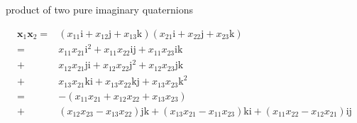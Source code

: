 \documentclass[
]{book}
\theoremstyle{definition}
\theoremstyle{definition}
\theoremstyle{definition}
\theoremstyle{definition}
\theoremstyle{remark}
\begin{document}
product of two pure imaginary quaternions

\[
\begin{aligned}
\boldsymbol{x}_{{\scriptscriptstyle 1}}\boldsymbol{x}_{{\scriptscriptstyle 2}}= & \left(x_{{\scriptscriptstyle 1}{\scriptscriptstyle 1}}\mathrm{i}+x_{{\scriptscriptstyle 1}{\scriptscriptstyle 2}}\mathrm{j}+x_{{\scriptscriptstyle 1}{\scriptscriptstyle 3}}\mathrm{k}\right)\left(x_{{\scriptscriptstyle 2}{\scriptscriptstyle 1}}\mathrm{i}+x_{{\scriptscriptstyle 2}{\scriptscriptstyle 2}}\mathrm{j}+x_{{\scriptscriptstyle 2}{\scriptscriptstyle 3}}\mathrm{k}\right)\\
= & x_{{\scriptscriptstyle 1}{\scriptscriptstyle 1}}x_{{\scriptscriptstyle 2}{\scriptscriptstyle 1}}\mathrm{i}^{{\scriptscriptstyle 2}}+x_{{\scriptscriptstyle 1}{\scriptscriptstyle 1}}x_{{\scriptscriptstyle 2}{\scriptscriptstyle 2}}\mathrm{i}\mathrm{j}+x_{{\scriptscriptstyle 1}{\scriptscriptstyle 1}}x_{{\scriptscriptstyle 2}{\scriptscriptstyle 3}}\mathrm{i}\mathrm{k}\\
+ & x_{{\scriptscriptstyle 1}{\scriptscriptstyle 2}}x_{{\scriptscriptstyle 2}{\scriptscriptstyle 1}}\mathrm{j}\mathrm{i}+x_{{\scriptscriptstyle 1}{\scriptscriptstyle 2}}x_{{\scriptscriptstyle 2}{\scriptscriptstyle 2}}\mathrm{j}^{{\scriptscriptstyle 2}}+x_{{\scriptscriptstyle 1}{\scriptscriptstyle 2}}x_{{\scriptscriptstyle 2}{\scriptscriptstyle 3}}\mathrm{j}\mathrm{k}\\
+ & x_{{\scriptscriptstyle 1}{\scriptscriptstyle 3}}x_{{\scriptscriptstyle 2}{\scriptscriptstyle 1}}\mathrm{k}\mathrm{i}+x_{{\scriptscriptstyle 1}{\scriptscriptstyle 3}}x_{{\scriptscriptstyle 2}{\scriptscriptstyle 2}}\mathrm{k}\mathrm{j}+x_{{\scriptscriptstyle 1}{\scriptscriptstyle 3}}x_{{\scriptscriptstyle 2}{\scriptscriptstyle 3}}\mathrm{k}^{{\scriptscriptstyle 2}}\\
= & -\left(x_{{\scriptscriptstyle 1}{\scriptscriptstyle 1}}x_{{\scriptscriptstyle 2}{\scriptscriptstyle 1}}+x_{{\scriptscriptstyle 1}{\scriptscriptstyle 2}}x_{{\scriptscriptstyle 2}{\scriptscriptstyle 2}}+x_{{\scriptscriptstyle 1}{\scriptscriptstyle 3}}x_{{\scriptscriptstyle 2}{\scriptscriptstyle 3}}\right)\\
+ & \left(x_{{\scriptscriptstyle 1}{\scriptscriptstyle 2}}x_{{\scriptscriptstyle 2}{\scriptscriptstyle 3}}-x_{{\scriptscriptstyle 1}{\scriptscriptstyle 3}}x_{{\scriptscriptstyle 2}{\scriptscriptstyle 2}}\right)\mathrm{j}\mathrm{k}+\left(x_{{\scriptscriptstyle 1}{\scriptscriptstyle 3}}x_{{\scriptscriptstyle 2}{\scriptscriptstyle 1}}-x_{{\scriptscriptstyle 1}{\scriptscriptstyle 1}}x_{{\scriptscriptstyle 2}{\scriptscriptstyle 3}}\right)\mathrm{k}\mathrm{i}+\left(x_{{\scriptscriptstyle 1}{\scriptscriptstyle 1}}x_{{\scriptscriptstyle 2}{\scriptscriptstyle 2}}-x_{{\scriptscriptstyle 1}{\scriptscriptstyle 2}}x_{{\scriptscriptstyle 2}{\scriptscriptstyle 1}}\right)\mathrm{i}\mathrm{j}\\

\end{aligned}\]
\end{document}
